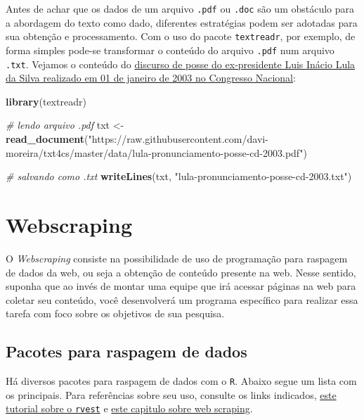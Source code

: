 \documentclass[]{book}
\newenvironment{Shaded}{\begin{snugshade}}{\end{snugshade}}
\newcommand{\CommentTok}[1]{\textcolor[rgb]{0.56,0.35,0.01}{\textit{#1}}}
\newcommand{\KeywordTok}[1]{\textcolor[rgb]{0.13,0.29,0.53}{\textbf{#1}}}
\newcommand{\NormalTok}[1]{#1}
\newcommand{\StringTok}[1]{\textcolor[rgb]{0.31,0.60,0.02}{#1}}
\begin{document}
Antes de achar que os dados de um arquivo \texttt{.pdf} ou \texttt{.doc} são um obstáculo para
a abordagem do texto como dado, diferentes estratégias podem ser adotadas para sua
obtenção e processamento. Com o uso do pacote \texttt{textreadr}, por exemplo, de forma
simples pode-se transformar o conteúdo do arquivo \texttt{.pdf} num arquivo \texttt{.txt}. Vejamos o
conteúdo do \href{http://www.biblioteca.presidencia.gov.br/presidencia/ex-presidentes/luiz-inacio-lula-da-silva/discursos/1o-mandato/2003/01-01-pronunciamento-a-nacao-do-presidente-da-republica-luiz-inacio-lula-da-silva-apos-a-cerimonia-de-posse.pdf/view}{discurso de posse do ex-presidente Luis Inácio Lula da Silva realizado em
01 de janeiro de 2003 no Congresso Nacional}:

\begin{Shaded}
\begin{Highlighting}[]
\KeywordTok{library}\NormalTok{(textreadr)}

\CommentTok{# lendo arquivo .pdf}
\NormalTok{txt <-}\StringTok{ }\KeywordTok{read_document}\NormalTok{(}\StringTok{"https://raw.githubusercontent.com/davi-moreira/txt4cs/master/data/lula-pronunciamento-posse-cd-2003.pdf"}\NormalTok{)}

\CommentTok{# salvando como .txt}
\KeywordTok{writeLines}\NormalTok{(txt, }\StringTok{"lula-pronunciamento-posse-cd-2003.txt"}\NormalTok{)}
\end{Highlighting}
\end{Shaded}

\hypertarget{webscraping}{%
\section{Webscraping}\label{webscraping}}

O \emph{Webscraping} consiste na possibilidade de uso de programação para raspagem de
dados da web, ou seja a obtenção de conteúdo presente na web. Nesse sentido, suponha
que ao invés de montar uma equipe que irá acessar páginas na web para coletar seu
conteúdo, você desenvolverá um programa específico para realizar essa tarefa com
foco sobre os objetivos de sua pesquisa.

\hypertarget{pacotes-para-raspagem-de-dados}{%
\subsection{Pacotes para raspagem de dados}\label{pacotes-para-raspagem-de-dados}}

Há diversos pacotes para raspagem de dados com o \texttt{R}. Abaixo segue um lista com os
principais. Para referências sobre seu uso, consulte os links indicados,
\href{https://www.datacamp.com/community/tutorials/r-web-scraping-rvest}{este tutorial sobre o \texttt{rvest}} e
\href{http://material.curso-r.com/scrape/}{este capitulo sobre web scraping}.
\end{document}
